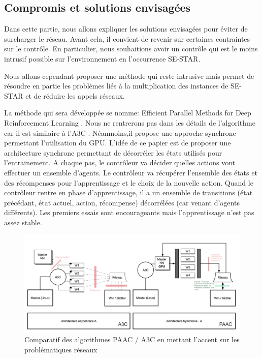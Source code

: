 \subsection{Compromis et solutions envisagées}

Dans cette partie, nous allons expliquer les solutions envisagées pour éviter de surcharger le réseau. Avant cela, il convient de revenir sur certaines contraintes sur le contrôle. En particulier, nous souhaitions avoir un contrôle qui est le moins intrusif possible sur l'environnement en l'occurrence SE-STAR.

Nous allons cependant proposer une méthode qui reste intrusive mais permet de résoudre en partie les problèmes liés à la multiplication des instances de SE-STAR et de réduire les appels réseaux. 

La méthode qui sera développée se nomme: Efficient Parallel Methods for Deep Reinforcement Learning \cite{2017arXiv170504862C}. Nous ne rentrerons pas dans les détails de l'algorithme car il est similaire à l'A3C \cite{DBLP:journals/corr/MnihBMGLHSK16}. Néanmoins,il propose une approche synchrone permettant l'utilisation du GPU. L'idée de ce papier est de proposer une architecture synchrone permettant de décorréler les états utilisés pour l'entrainement. A chaque pas, le contrôleur va décider quelles actions vont effectuer un ensemble d'agents. Le contrôleur va récupérer l'ensemble des états et des récompenses pour l'apprentissage et le choix de la nouvelle action. Quand le contrôleur rentre en phase d'apprentissage, il a un ensemble de transitions (état précédant, état actuel, action, récompense) décorrélées (car venant d'agents différents). Les premiers essais sont encourageants mais l'apprentissage n'est pas assez stable.

\begin{figure}[h!]
\begin{center}
\includegraphics[scale=.4]{./assets/interfaceReseau/paaca3c}
\caption{Comparatif des algorithmes PAAC / A3C en mettant l'accent sur les problématiques réseaux}
\end{center}
\end{figure}

